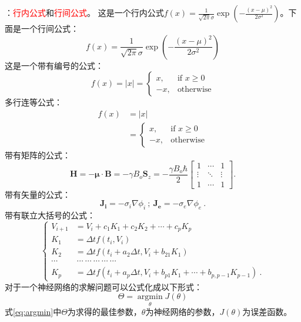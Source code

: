 \documentclass[UTF8]{ctexart}
\numberwithin{equation}{section} %
\numberwithin{table}{section} %
\newcommand{\argmin}{\mathop{\mathrm{argmin}}\limits}
\newcommand{\red}[1]{{\textcolor{red}{#1}}}%
\begin{document}
：\red{行内公式}和\red{行间公式}。
这是一个行内公式$f(x) = \frac{1}{\sqrt{2\pi}\sigma}\exp{(-\frac{(x-\mu)^2}{2\sigma^2})}$。下面是一个行间公式：
$$
f(x) = \frac{1}{\sqrt{2\pi}\sigma}\exp{(-\frac{(x-\mu)^2}{2\sigma^2})}
$$
这是一个带有编号的公式：
\begin{equation}
f(x)= |x| = 
\begin{cases}
x,& \text{if } x\geq 0\\
-x,              & \text{otherwise}
\end{cases}
\label{eq:cases}
\end{equation}
多行连等公式：
\begin{equation}
\begin{split}
f(x) &= |x| \\
&= \begin{cases}
x,& \text{if } x\geq 0\\
-x,              & \text{otherwise}
\end{cases}
\end{split}
\end{equation}
带有矩阵的公式：
\begin{equation}
\mathbf{H} = -\mathbf\mu \cdot \mathbf{B} = -\gamma B_o \mathbf{S}_z = -\frac{\gamma B_o\hbar}{2} 
\begin{bmatrix}
1& \cdots &1\\ 
\vdots & \ddots & \vdots \\
1 & \cdots & 1 
\end{bmatrix}.
\label{eq:matrix}
\end{equation}
带有矢量的公式：%
\begin{equation}
\label{eq:current_density_inandout}
\bm{J_i} = -\sigma_i \nabla \phi_i ~;~ \bm{J_e}= -\sigma_e \nabla \phi_e ~.
\end{equation}
带有联立大括号的公式：%
\begin{equation}
\label{eq:runge_p_eq}
\left\lbrace
\begin{aligned}
V_{i+1} &= V_i + c_1 K_1 + c_2 K_2 + \cdots + c_p K_p \\
K_1 &= \Delta t f(t_i ,V_i) \\
K_2 &= \Delta t f\left(t_i + a_2 \Delta t, V_i + b_{21} K_1\right) \\
\cdots&~\cdots~\cdots~\cdots~\cdots~\cdots \\
K_p &= \Delta t f\left( t_i + a_p \Delta t, V_i + b_{p1} K_1 + \cdots + b_{p,p-1} K_{p-1}\right) ~.
\end{aligned}
\right.
\end{equation}
对于一个神经网络的求解问题可以公式化成以下形式：
\begin{equation}
\Theta = \argmin_{\theta} J(\theta)
\label{eq:argmin}
\end{equation}
式\ref{eq:argmin}中$\Theta$为求得的最佳参数，$\theta$为神经网络的参数，$J(\theta)$为误差函数。
\end{document}
